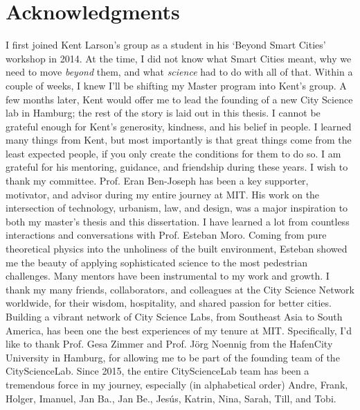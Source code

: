 \section*{Acknowledgments}
 {
  I first joined Kent Larson's group as a student in his `Beyond Smart Cities' workshop in 2014. At the time, I did not know what Smart Cities meant, why we need to move \textit{beyond} them, and what \textit{science} had to do with all of that. Within a couple of weeks, I knew I'll be shifting my Master program into Kent's group. A few months later, Kent would offer me to lead the founding of a new City Science lab in Hamburg; the rest of the story is laid out in this thesis.
  \newline
  I cannot be grateful enough for Kent's generosity, kindness, and his belief in people. I learned many things from Kent, but most importantly is that great things come from the least expected people, if you only create the conditions for them to do so. I am grateful for his mentoring, guidance, and friendship during these years.
  \newline
  I wish to thank my committee. Prof. Eran Ben-Joseph has been a key supporter, motivator, and advisor during my entire journey at MIT. His work on the intersection of technology, urbanism, law, and design, was a major inspiration to both my master's thesis and this dissertation.
  I have learned a lot from countless interactions and conversations with Prof. Esteban Moro. Coming from pure theoretical physics into the unholiness of the built environment, Esteban showed me the beauty of applying sophisticated science to the most pedestrian challenges.
  \newline
  Many mentors have been instrumental to my work and growth.
  \newline
  I thank my many friends, collaborators, and colleagues at the City Science Network worldwide, for their wisdom, hospitality, and shared passion for better cities. Building a vibrant network of City Science Labs, from Southeast Asia to South America, has been one the best experiences of my tenure at MIT. Specifically, I'd like to thank Prof. Gesa Zimmer and Prof. Jörg Noennig from the HafenCity University in Hamburg, for allowing me to be part of the founding team of the CityScienceLab. Since 2015, the entire CityScienceLab team has been a tremendous force in my journey, especially (in alphabetical order) Andre, Frank, Holger, Imanuel, Jan Ba., Jan Be., Jesús, Katrin, Nina, Sarah, Till, and Tobi.
  \newline
}
